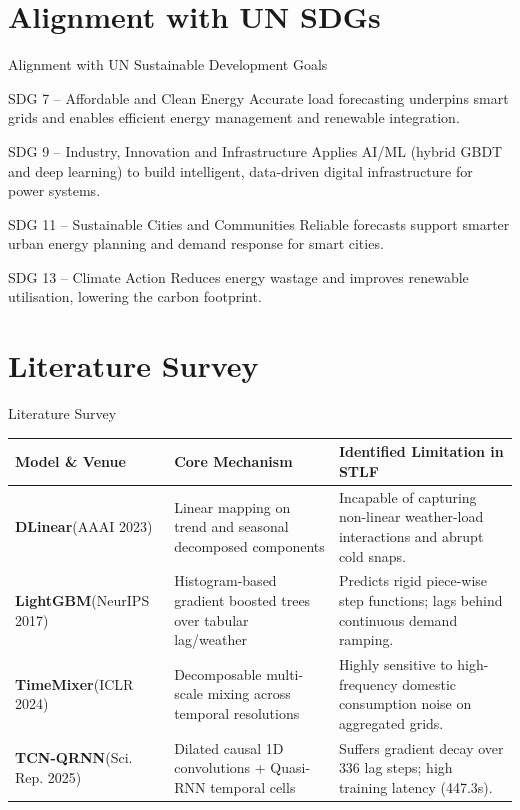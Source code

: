 \documentclass[aspectratio=169]{beamer}
\begin{document}
\section{Alignment with UN SDGs}
\begin{frame}{Alignment with UN Sustainable Development Goals}
  \begin{block}{SDG 7 -- Affordable and Clean Energy}
    Accurate load forecasting underpins smart grids and enables efficient energy management and renewable integration.
  \end{block}
  \begin{block}{SDG 9 -- Industry, Innovation and Infrastructure}
    Applies AI/ML (hybrid GBDT and deep learning) to build intelligent, data-driven digital infrastructure for power systems.
  \end{block}
  \begin{block}{SDG 11 -- Sustainable Cities and Communities}
    Reliable forecasts support smarter urban energy planning and demand response for smart cities.
  \end{block}
  \begin{block}{SDG 13 -- Climate Action}
    Reduces energy wastage and improves renewable utilisation, lowering the carbon footprint.
  \end{block}
\end{frame}

\section{Literature Survey}
\begin{frame}{Literature Survey}
  \scriptsize
  \begin{tabular}{p{2.6cm}p{5.2cm}p{5.4cm}}
    \toprule
    \textbf{Model \& Venue} & \textbf{Core Mechanism} & \textbf{Identified Limitation in STLF} \\ \midrule
    \textbf{DLinear}\newline (AAAI 2023) & Linear mapping on trend and seasonal decomposed components & Incapable of capturing non-linear weather-load interactions and abrupt cold snaps. \\ \addlinespace
    \textbf{LightGBM}\newline (NeurIPS 2017) & Histogram-based gradient boosted trees over tabular lag/weather & Predicts rigid piece-wise step functions; lags behind continuous demand ramping. \\ \addlinespace
    \textbf{TimeMixer}\newline (ICLR 2024) & Decomposable multi-scale mixing across temporal resolutions & Highly sensitive to high-frequency domestic consumption noise on aggregated grids. \\ \addlinespace
    \textbf{TCN-QRNN}\newline (Sci. Rep. 2025) & Dilated causal 1D convolutions + Quasi-RNN temporal cells & Suffers gradient decay over 336 lag steps; high training latency (447.3s). \\ \bottomrule
  \end{tabular}
\end{frame}
\end{document}
